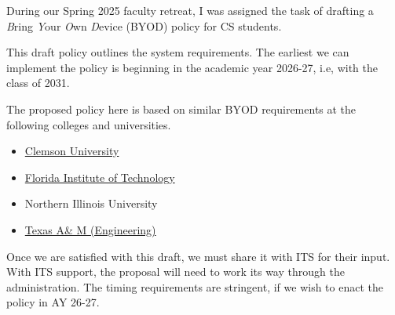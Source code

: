 \noindent 
During our Spring 2025 faculty retreat, I was assigned the task of drafting a \emph{B}ring \emph{Y}our \emph{O}wn \emph{D}evice (BYOD) policy for CS students. 

This draft policy outlines the system requirements. The earliest we can implement the policy is beginning in the academic year 2026-27, i.e, with the class of 2031.

The proposed policy here is based on similar BYOD requirements at the following colleges and universities.

\begin{itemize}
    \item \href{https://clemsonpub.cfmnetwork.com/B.aspx?BookId=11654&PageId=458060}{Clemson University}
    
    \item \href{https://www.fit.edu/policies/information-technology/policies/it-1015-bring-your-own-device-byod-policy/}{Florida Institute of Technology}
    
    \item Northern Illinois University

    \item \href{https://engineering.tamu.edu/academics/byod/index.html}{Texas A\& M (Engineering)}
\end{itemize}

Once we are satisfied with this draft, we must share it with ITS for their input. With ITS support, the proposal will need to work its way through the administration. The timing requirements are stringent, if we wish to enact the policy in AY 26-27.